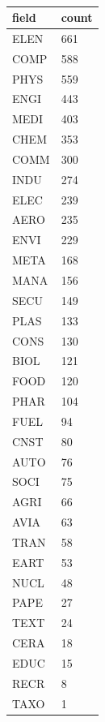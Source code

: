 \documentclass[12pt,letterpaper]{article}
\begin{document}
\begin{table}[H]
\scriptsize
\centering
\begin{tabular}{ll}
\hline
field & count \\ \hline
ELEN  & 661   \\
COMP  & 588   \\
PHYS  & 559   \\
ENGI  & 443   \\
MEDI  & 403   \\
CHEM  & 353   \\
COMM  & 300   \\
INDU  & 274   \\
ELEC  & 239   \\
AERO  & 235   \\
ENVI  & 229   \\
META  & 168   \\
MANA  & 156   \\
SECU  & 149   \\
PLAS  & 133   \\
CONS  & 130   \\
BIOL  & 121   \\
FOOD  & 120   \\
PHAR  & 104   \\
FUEL  & 94    \\
CNST  & 80    \\
AUTO  & 76    \\
SOCI  & 75    \\
AGRI  & 66    \\
AVIA  & 63    \\
TRAN  & 58    \\
EART  & 53    \\
NUCL  & 48    \\
PAPE  & 27    \\
TEXT  & 24    \\
CERA  & 18    \\
EDUC  & 15    \\
RECR  & 8     \\
TAXO  & 1     \\ \hline
\end{tabular}
\caption{}
\label{tab:8}
\end{table}
\end{document}
